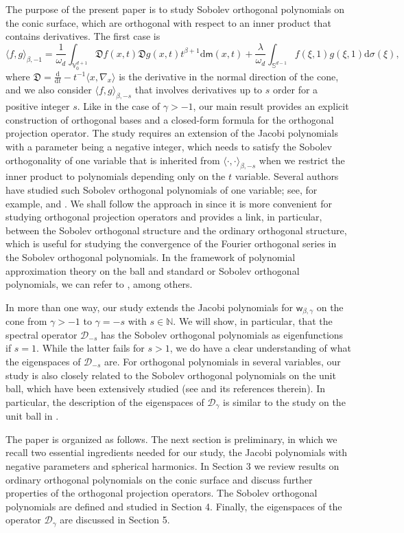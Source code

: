 \documentclass{amsart}
\theoremstyle{remark}
\def\la{{\langle}}
\def\ra{{\rangle}}
\def\d{\mathrm{d}}
\def\sm{{\mathsf m}}
\def\sw{{\mathsf w}}
\def\fD{{\mathfrak D}}
\def\b{{\beta}}
\def\g{{\gamma}}
\def\l{{\lambda}}
\def\o{{\omega}}
\def\s{\sigma}
\def\la{{\langle}}
\def\ra{{\rangle}}
\def\CD{{\mathcal D}}
\def\NN{{\mathbb N}}
\def\SS{{\mathbb S}}
\def\VV{{\mathbb V}}
\def\f{\frac}
\begin{document}
The purpose of the present paper is to study Sobolev orthogonal polynomials on the conic surface, which
are orthogonal with respect to an inner product that contains derivatives. The first case is
$$
  \la f,g\ra_{\b, -1} =  \frac{1}{\o_d}
       \int_{\VV_0^{d+1}} \fD f (x,t)\fD g(x,t) t^{\b+1} \d \sm(x,t)
          +  \frac{\l}{\o_d} \int_{\SS^{d-1}}f(\xi,1) g(\xi,1) \d \s (\xi),
$$
where $\fD = \f{\d}{\d t} - t^{-1} \la x, \nabla_x\ra$ is the derivative in the normal direction of the cone, and we also 
consider $\la f,g\ra_{\b, -s}$ that involves derivatives up to $s$ order for a positive integer $s$. 
 Like in the case of $\g > -1$, our main result provides an explicit construction of orthogonal bases and a closed-form 
 formula for the orthogonal projection operator. The study requires an
extension of the Jacobi polynomials with a parameter being a negative integer, which needs to satisfy the
Sobolev orthogonality of one variable that is inherited from $\la \cdot,\cdot\ra_{\b,-s}$ when we restrict the
inner product to polynomials depending only on the $t$ variable. Several authors have studied such 
Sobolev orthogonal polynomials of one variable; see, for example, \cite{AAR02, MPP, GW, Sh1, Sh2, X19}
and \cite{MX}. We shall follow the approach in \cite{X19} since it is more convenient for studying orthogonal
projection operators and provides a link, in particular, between the Sobolev orthogonal structure and
the ordinary orthogonal structure, which is useful for studying the convergence of the Fourier orthogonal
series in the Sobolev orthogonal polynomials. In the framework of polynomial approximation theory on the ball
and standard or Sobolev orthogonal polynomials, we can refer to \cite{BF21, DX11, DaiX, F17a, F17b, LX14, PX18, W}, 
among others.  

In more than one way, our study extends the Jacobi polynomials for $\sw_{\b,\g}$ on the cone from
$\g > -1$ to $\g = -s$ with $s \in \NN$. We will show, in particular, that the spectral operator $\CD_{-s}$
has the Sobolev orthogonal polynomials as eigenfunctions if $s = 1$. While the latter fails for $s > 1$,
we do have a clear understanding of what the eigenspaces of $\CD_{-s}$ are. For orthogonal polynomials
in several variables, our study is also closely related to the Sobolev orthogonal polynomials on the unit ball,
which have been extensively studied (see \cite{DX} and its references therein). In particular, the description
of the eigenspaces of $\CD_\g$ is similar to the study on the unit ball in \cite{PX09}.

The paper is organized as follows. The next section is preliminary, in which we recall two essential ingredients
needed for our study, the Jacobi polynomials with negative parameters and spherical harmonics. In Section 3
we review results on ordinary orthogonal polynomials on the conic surface and discuss further properties of
the orthogonal projection operators. The Sobolev orthogonal polynomials are defined and studied in Section 4.
Finally, the eigenspaces of the operator $\CD_\g$ are discussed in Section 5.
\end{document}
